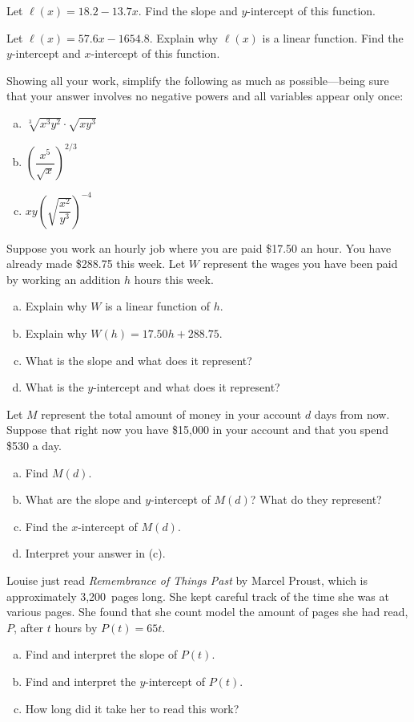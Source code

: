 \documentclass[11pt,letterpaper]{article}
\begin{document}
\prob Let $\ell(x)= 18.2 - 13.7x$. Find the slope and $y$-intercept of this function.  \pspace


\prob Let $\ell(x)= 57.6x - 1654.8$. Explain why $\ell(x)$ is a linear function. Find the $y$-intercept and $x$-intercept of this function. \pspace


\prob Showing all your work, simplify the following as much as possible---being sure that your answer involves no negative powers and all variables appear only once:
	\begin{enumerate}[(a)]
	\item $\sqrt[3]{x^3 y^2} \cdot \sqrt{x y^3}$
	\item $\left( \dfrac{x^5}{\sqrt{x}} \right)^{2/3}$
	\item $xy \left( \sqrt{\dfrac{x^2}{y^3}} \right)^{-4}$
	\end{enumerate} \pspace


\prob Suppose you work an hourly job where you are paid \$17.50 an hour. You have already made \$288.75 this week. Let $W$ represent the wages you have been paid by working an addition $h$ hours this week.
	\begin{enumerate}[(a)]
	\item Explain why $W$ is a linear function of $h$. 
	\item Explain why $W(h)= 17.50h + 288.75$.
	\item What is the slope and what does it represent?
	\item What is the $y$-intercept and what does it represent?
	\end{enumerate} \pspace


\prob Let $M$ represent the total amount of money in your account $d$ days from now. Suppose that right now you have \$15,000 in your account and that you spend \$530 a day.
	\begin{enumerate}[(a)]
	\item Find $M(d)$.
	\item What are the slope and $y$-intercept of $M(d)$? What do they represent?
	\item Find the $x$-intercept of $M(d)$.
	\item Interpret your answer in (c). 
	\end{enumerate} \pspace


\prob Louise just read \textit{Remembrance of Things Past} by Marcel Proust, which is approximately 3,200~pages long. She kept careful track of the time she was at various pages. She found that she count model the amount of pages she had read, $P$, after $t$ hours by $P(t)= 65t$.
	\begin{enumerate}[(a)]
	\item Find and interpret the slope of $P(t)$.
	\item Find and interpret the $y$-intercept of $P(t)$.
	\item How long did it take her to read this work?
	\end{enumerate} \pspace
\end{document}
